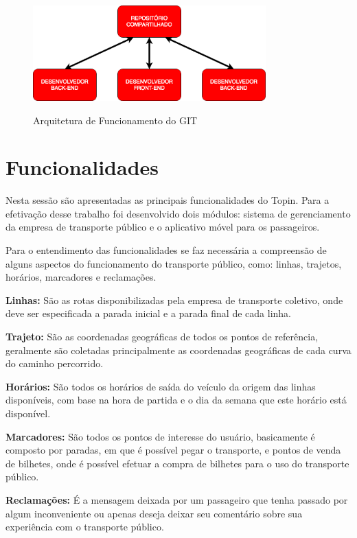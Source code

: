 {{{{{{{\begin{figure}[H]
\caption{Arquitetura de Funcionamento do GIT}
\centering
\includegraphics[width=0.8\textwidth]{imagens/git.png}
\label{fig:git}
\end{figure}

\section{Funcionalidades}

Nesta sessão são apresentadas as principais funcionalidades do Topin. Para a efetivação desse trabalho foi desenvolvido dois módulos: sistema de gerenciamento da empresa de transporte público e o aplicativo móvel para os passageiros.

Para o entendimento das funcionalidades se faz necessária a compreensão de alguns aspectos do funcionamento do transporte público, como: linhas, trajetos, horários, marcadores e reclamações.

\begin{lista}
\item \textbf{Linhas:} São as rotas disponibilizadas pela empresa de transporte coletivo, onde deve ser especificada a parada inicial e a parada final de cada linha.
\item \textbf{Trajeto:} São as coordenadas geográficas de todos os pontos de referência, geralmente são coletadas principalmente as coordenadas geográficas de cada curva do caminho percorrido.
\item \textbf{Horários:} São todos os horários de saída do veículo da origem das linhas disponíveis, com base na hora de partida e o dia da semana que este horário está disponível.
\item \textbf{Marcadores:} São todos os pontos de interesse do usuário, basicamente é composto por paradas, em que é possível pegar o transporte, e pontos de venda de bilhetes, onde é possível efetuar a compra de bilhetes para o uso do transporte público.
\item \textbf{Reclamações:} É a mensagem deixada por um passageiro que tenha passado por algum inconveniente ou apenas deseja deixar seu comentário sobre sua experiência com o transporte público.
\end{lista}

}}}}}}}
